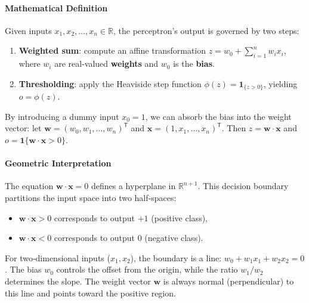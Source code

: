 \documentclass{tufte-handout}
\begin{document}
\paragraph{Mathematical Definition}

Given inputs $x_1, x_2, \dots, x_n \in \mathbb{R}$, the perceptron’s output is governed by two steps:
\begin{enumerate}
    \item \textbf{Weighted sum}: compute an affine transformation $z = w_0 + \sum_{i=1}^n w_i x_i$, where $w_i$ are real‑valued \textbf{weights} and $w_0$ is the \textbf{bias}.
    \item \textbf{Thresholding}: apply the Heaviside step function $\phi(z) = \mathbf{1}_{\{z>0\}}$, yielding $o = \phi(z)$.
\end{enumerate}
By introducing a dummy input $x_0 = 1$, we can absorb the bias into the weight vector: let $\mathbf{w} = (w_0, w_1, \dots, w_n)^{\mathsf{T}}$ and $\mathbf{x} = (1, x_1, \dots, x_n)^{\mathsf{T}}$. Then $z = \mathbf{w}\cdot\mathbf{x}$ and $o = \mathbf{1}\{\mathbf{w}\cdot\mathbf{x} > 0\}$.

\paragraph{Geometric Interpretation}

The equation $\mathbf{w}\cdot\mathbf{x} = 0$ defines a hyperplane in $\mathbb{R}^{n+1}$. This decision boundary partitions the input space into two half‑spaces:
\begin{itemize}
    \item $\mathbf{w}\cdot\mathbf{x} > 0$ corresponds to output $+1$ (positive class),
    \item $\mathbf{w}\cdot\mathbf{x} < 0$ corresponds to output $0$ (negative class).
\end{itemize}
For two‑dimensional inputs ($x_1, x_2$), the boundary is a line: $w_0 + w_1 x_1 + w_2 x_2 = 0$. The bias $w_0$ controls the offset from the origin, while the ratio $w_1/w_2$ determines the slope. The weight vector $\mathbf{w}$ is always normal (perpendicular) to this line and points toward the positive region.
\end{document}
